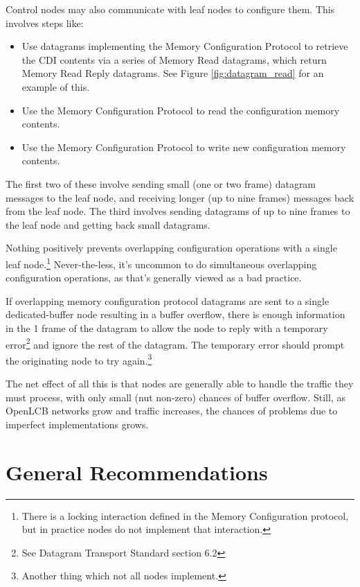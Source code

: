 \documentclass[11pt]{article}
\begin{document}
Control nodes may also communicate with leaf nodes to configure them. This involves
steps like:
\begin{itemize}
\item Use datagrams implementing the Memory Configuration Protocol to retrieve 
    the CDI contents via a series of Memory Read datagrams, which 
    return Memory Read Reply datagrams.  See
    Figure \ref{fig:datagram_read} 
    for an example of this.
\item Use the Memory Configuration Protocol to read
    the configuration memory contents.
\item Use the Memory Configuration Protocol to write new
    configuration memory contents.
\end{itemize}

The first two of these involve sending small (one or two frame) datagram
messages to the leaf node, and receiving longer (up to nine frames) messages
back from the leaf node.  The third involves sending datagrams of up to 
nine frames to the leaf node and getting back small datagrams.

Nothing positively prevents overlapping configuration operations with a single leaf 
node.\footnote{There is a locking interaction defined in the Memory Configuration protocol,
    but in practice nodes do not implement that interaction.}
Never-the-less, it's uncommon to do simultaneous overlapping configuration operations, 
as that's generally viewed as a bad practice.

If overlapping memory configuration protocol datagrams 
are sent to a single dedicated-buffer node
resulting in a buffer overflow, there is enough 
information in the 1 frame of the datagram to allow 
the node to reply with a 
temporary error\footnote{See Datagram Transport Standard
    section 6.2}
and ignore the rest of the datagram.
The temporary error should prompt the 
originating node to try again.\footnote{Another thing which not all nodes implement.}

\cbstart
The net effect of all this is that nodes are generally able to 
handle the traffic they must process, with only small (nut non-zero) 
chances of buffer overflow. 
Still, as OpenLCB networks grow and 
traffic increases, the chances of problems due to 
imperfect implementations grows.
\cbend

\section{General Recommendations} 
\end{document}
